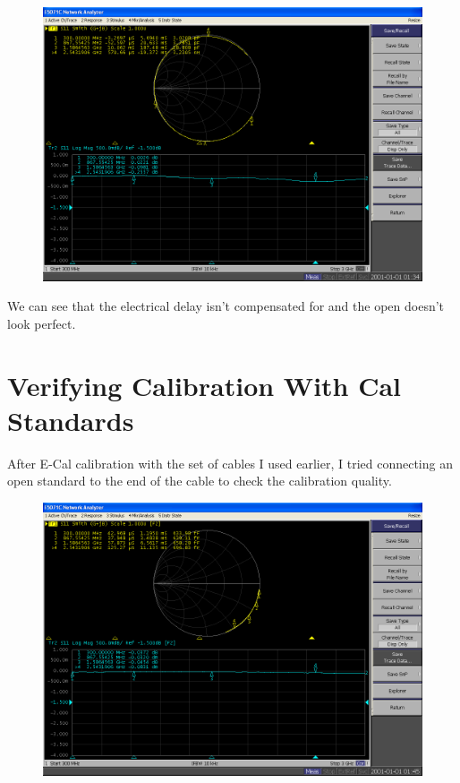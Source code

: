 \documentclass[11pt]{article}
\begin{document}
\begin{figure}[H]
	\centering \includegraphics[width=\linewidth-6cm]{images/S11_OPEN_STD_BEFORE_CAL.PNG}
\end{figure}

We can see that the electrical delay isn't compensated for and the open doesn't look perfect.

\section{Verifying Calibration With Cal Standards}
After E-Cal calibration with the set of cables I used earlier, I tried connecting an open standard to the end of the cable to check the calibration quality.

\begin{figure}[H]
	\centering \includegraphics[width=\linewidth-6cm]{images/S11_OPEN_STD_AFTER_CAL.PNG}
\end{figure}
\end{document}
